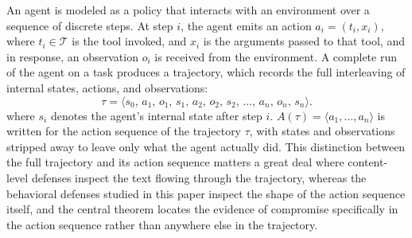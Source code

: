 \documentclass[journal]{IEEEtran}
\theoremstyle{remark}
\begin{document}
An agent is modeled as a policy that interacts with an environment over a sequence of discrete steps. At step $i$, the agent emits an action $a_i=(t_i,x_i)$, where $t_i\in\mathcal{T}$ is the tool invoked, and $x_i$ is the arguments passed to that tool, and in response, an observation $o_i$ is received from the environment. A complete run of the agent on a task produces a trajectory, which records the full interleaving of internal states, actions, and observations:
\[
\tau = \langle s_0,\, a_1,\, o_1,\, s_1,\, a_2,\, o_2,\, s_2,\, \ldots,\, a_n,\, o_n,\, s_n \rangle.
\]
where $s_i$ denotes the agent's internal state after step $i$. $A(\tau)=\langle a_1,\ldots,a_n\rangle$ is written for the action sequence of the trajectory $\tau$, with states and observations stripped away to leave only what the agent actually did. This distinction between the full trajectory and its action sequence matters a great deal where content-level defenses inspect the text flowing through the trajectory, whereas the behavioral defenses studied in this paper inspect the shape of the action sequence itself, and the central theorem locates the evidence of compromise specifically in the action sequence rather than anywhere else in the trajectory.
\end{document}
